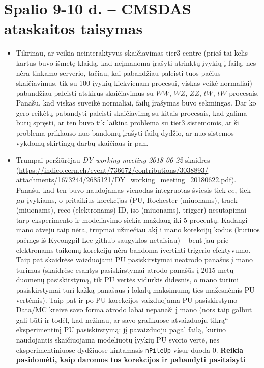 \documentclass[a4paper, 12pt]{article}
\newcommand{\ltq}[1]{{\quotedblbase{}#1\textquotedblleft{}}}
\newcommand{\ttt}[1]{\texttt{#1}}
\begin{document}
\section{Spalio 9-10 d. -- CMSDAS ataskaitos taisymas}
\begin{itemize}
	\item Tikrinau, ar veikia neinteraktyvus skaičiavimas tier3 centre
	(prieš tai kelis kartus buvo išmetę klaidą, kad neįmanoma įrašyti atrinktų
	įvykių į failą, nes nėra tinkamo serverio, tačiau, kai pabandžiau paleisti
	tuos pačius skaičiavimus, tik su 100 įvykių kiekvienam procesui, viskas veikė
	normaliai) -- pabandžiau paleisti atskirus skaičiavimus su $WW$, $WZ$, $ZZ$,
	$tW$, $\overline{t}W$ procesais. Panašu, kad viskas suveikė normaliai, failų
	įrašymas buvo sėkmingas. Dar ko gero reikėtų pabandyti paleisti skaičiavimą
	su kitais procesais, kad galima būtų spręsti, ar ten buvo tik laikina problema
	su tier3 sistemomis, ar ši problema priklauso nuo bandomų įrašyti failų dydžio,
	ar nuo sistemos vykdomų skirtingų darbų skaičiaus ir pan.
	\item Trumpai peržiūrėjau \textit{DY working meeting 2018-06-22} skaidres
	(\url{https://indico.cern.ch/event/736672/contributions/3038893/
	attachments/1673244/2685121/DY_working_meeting_20180622.pdf}).
	Panašu, kad ten buvo naudojamas vienodas integruotas šviesis tiek $ee$, tiek
	$\mu\mu$ įvykiams, o pritaikius korekcijas (PU, Rochester (miuonams),
	track (miuonams), reco (elektronams) ID, iso (miuonams), trigger) nesutapimai
	tarp eksperimento ir modeliavimo siekia maždaug iki 5 procentų. Kadangi mano
	atveju taip nėra, trupmai užmečiau akį i mano korekcijų kodus (kuriuos paėmęs
	iš Kyeongpil Lee github saugyklos netaisiau) -- bent jau prie elektronams
	taikomų korekcijų nėra bandoma įvertinti trigerio efektyvumo. Taip pat skaidrėse
	vaizduojami PU pasiskirstymai neatrodo panašūs į mano turimus (skaidrėse
	esantys pasiskirstymai atrodo panašūs į 2015 metų duomenų pasiskirstymą, tik
	PU vertės vidurkis didesnis, o mano turimi pasiskirstymai turi kažką panašaus
	į lokalų maksimumą ties mažesnėmis PU vertėmis). Taip pat ir po PU korekcijos
	vaizduojama PU pasiskirstymo Data/MC kreivė savo forma atrodo labai nepanaši
	į mano (nors taip galbūt gali būti ir todėl, kad nežinau, ar savo grafikuose
	atvaizduoju \ltq{tikrą} eksperimentinį PU pasiskirstymą: jį pavaizduoju pagal
	failą, kuriuo naudojantis skaičiuojama modeliuotų įvykių PU svorio vertė, nes
	eksperimentiniuose dydžiuose kintamasis \ttt{nPileUp} visur duoda 0.
	\textbf{Reikia pasidomėti, kaip daromos tos korekcijos ir pabandyti pasitaisyti
}
\end{itemize}
\end{document}
